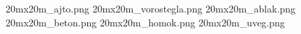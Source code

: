 20mx20m_ajto.png
20mx20m_vorostegla.png
20mx20m_ablak.png
20mx20m_beton.png
20mx20m_homok.png
20mx20m_uveg.png
